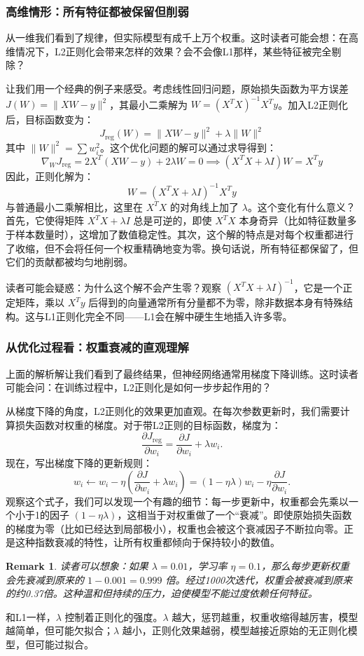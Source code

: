 \documentclass[lang=cn,zihao=-4,a4paper,fontset=windows]{beautybook}
\renewcommand{\partial}{∂}
\newtheorem*{remark}{\textbf{Remark}}
\begin{document}
\subsubsection*{高维情形：所有特征都被保留但削弱}

从一维我们看到了规律，但实际模型有成千上万个权重。这时读者可能会想：在高维情况下，L2正则化会带来怎样的效果？会不会像L1那样，某些特征被完全剔除？

让我们用一个经典的例子来感受。考虑线性回归问题，原始损失函数为平方误差 \(J(W) = \|XW - y\|^2\)，其最小二乘解为 \(W = (X^TX)^{-1}X^Ty\)。加入L2正则化后，目标函数变为：
\[J_{\text{reg}}(W) = \|XW - y\|^2 + \lambda \|W\|^2\]
其中 \(\|W\|^2 = \sum w_i^2\)。这个优化问题的解可以通过求导得到：
\[\nabla_W J_{\text{reg}} = 2X^T(XW - y) + 2\lambda W = 0\implies (X^TX + \lambda I)W = X^Ty\]
因此，正则化解为：
\[W = (X^TX + \lambda I)^{-1} X^Ty\]
与普通最小二乘解相比，这里在 \(X^TX\) 的对角线上加了 \(\lambda\)。这个变化有什么意义？首先，它使得矩阵 \(X^TX + \lambda I\) 总是可逆的，即使 \(X^TX\) 本身奇异（比如特征数量多于样本数量时），这增加了数值稳定性。其次，这个解的特点是对每个权重都进行了收缩，但不会将任何一个权重精确地变为零。换句话说，所有特征都保留了，但它们的贡献都被均匀地削弱。

读者可能会疑惑：为什么这个解不会产生零？观察 \((X^TX + \lambda I)^{-1}\)，它是一个正定矩阵，乘以 \(X^Ty\) 后得到的向量通常所有分量都不为零，除非数据本身有特殊结构。这与L1正则化完全不同——L1会在解中硬生生地插入许多零。

\subsubsection*{从优化过程看：权重衰减的直观理解}

上面的解析解让我们看到了最终结果，但神经网络通常用梯度下降训练。这时读者可能会问：在训练过程中，L2正则化是如何一步步起作用的？

从梯度下降的角度，L2正则化的效果更加直观。在每次参数更新时，我们需要计算损失函数对权重的梯度。对于带L2正则的目标函数，梯度为：
\[
\frac{\partial J_{\text{reg}}}{\partial w_i} = \frac{\partial J}{\partial w_i} + \lambda w_i.
\]
现在，写出梯度下降的更新规则：
\[
w_i \leftarrow w_i - \eta \left( \frac{\partial J}{\partial w_i} + \lambda w_i \right) = (1 - \eta \lambda) w_i - \eta \frac{\partial J}{\partial w_i}.
\]
观察这个式子，我们可以发现一个有趣的细节：每一步更新中，权重都会先乘以一个小于1的因子 \((1 - \eta \lambda)\)，这相当于对权重做了一个“衰减”。即使原始损失函数的梯度为零（比如已经达到局部极小），权重也会被这个衰减因子不断拉向零。正是这种指数衰减的特性，让所有权重都倾向于保持较小的数值。
\begin{remark}
读者可以想象：如果 \(\lambda = 0.01\)，学习率 \(\eta = 0.1\)，那么每步更新权重会先衰减到原来的 \(1 - 0.001 = 0.999\) 倍。经过1000次迭代，权重会被衰减到原来的约0.37倍。这种温和但持续的压力，迫使模型不能过度依赖任何特征。
\end{remark}
和L1一样，\(\lambda\) 控制着正则化的强度。\(\lambda\) 越大，惩罚越重，权重收缩得越厉害，模型越简单，但可能欠拟合；\(\lambda\) 越小，正则化效果越弱，模型越接近原始的无正则化模型，但可能过拟合。
\end{document}

